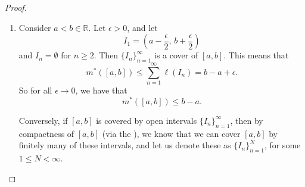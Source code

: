 \documentclass[notoc,notitlepage]{tufte-book}
\begin{document}
\begin{proof}
  \begin{enumerate}
    \item Consider $a < b \in \mathbb{R}$. Let $\epsilon > 0$, and let
      \begin{equation*}
        I_1 = \left( a - \frac{\epsilon}{2}, \, b + \frac{\epsilon}{2} \right)
      \end{equation*}
      and $I_n = \emptyset$ for $n \geq 2$. Then $\{ I_n \}_{n=1}^{\infty}$ is a
      cover of $[a, b]$. This means that
      \begin{equation*}
        m^*([a, b]) \leq \sum_{n=1}^{\infty} \ell(I_n) = b - a + \epsilon.
      \end{equation*}
      So for all $\epsilon \to 0$, we have that
      \begin{equation*}
        m^*([a, b]) \leq b - a.
      \end{equation*}

       Conversely, if $[a, b]$ is covered by open
      intervals $\{ I_n \}_{n=1}^{\infty}$, then by compactness of $[a, b]$ (via
      the ), we know that we can cover $[a, b]$ by
      finitely many of these intervals, and let us denote these as $\{ I_n
      \}_{n=1}^{N}$, for some $1 \leq N < \infty$.


\end{enumerate}
\end{proof}
\end{document}
